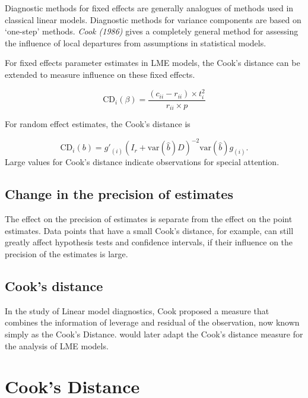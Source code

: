 \documentclass[12pt, a4paper]{report}
\theoremstyle{plain}
\theoremstyle{definition}
\theoremstyle{remark}
\begin{document}
		
		
		Diagnostic methods for fixed effects are generally analogues of methods used in classical linear models.
		Diagnostic methods for variance components are based on `one-step' methods.
		\textit{Cook (1986)} gives a completely general method for assessing the influence of local departures from assumptions in statistical models.
		
		For fixed effects parameter estimates in LME models, the  Cook's distance can be extended to measure influence on these fixed effects.
		
		\[
		\mbox{CD}_{i}(\beta) = \frac{(c_{ii} - r_{ii}) \times t^2_{i}}{r_{ii} \times p}
		\]
		
		For random effect estimates, the  Cook's distance is
		
		\[
		\mbox{CD}_{i}(b) = g{\prime}_{(i)} (I_{r} + \mbox{var}(\hat{b})D)^{-2}\mbox{var}(\hat{b})g_{(i)}.
		\]
		Large values for Cook's distance indicate observations for special attention.
		
		\subsection{Change in the precision of estimates}
		
		The effect on the precision of estimates is separate from the effect on the point estimates. Data points that
		have a small Cook's distance, for example, can still greatly affect hypothesis tests and confidence intervals, if their  influence on the precision of the estimates is large.
		
		
		
		
		\subsection*{Cook's distance}
		In the study of Linear model diagnostics, Cook proposed a measure that combines the information of leverage and residual of the observation, now known simply as the Cook's Distance. \citet{CPJ} would later adapt the Cook's distance measure for the analysis of LME models.

		\section{Cook's Distance} %
		
\end{document}
